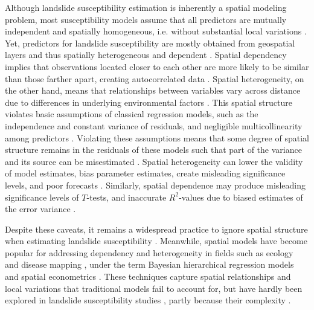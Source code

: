 \documentclass[lineno,pdflatex,sn-basic]{sn-jnl}%
\theoremstyle{thmstyleone}%
\theoremstyle{thmstyletwo}%
\theoremstyle{thmstylethree}%
\begin{document}
Although landslide susceptibility estimation is inherently a spatial modeling problem, most susceptibility models assume that all predictors are mutually independent and spatially homogeneous, i.e. without substantial local variations \citep{xiao2021reducing}. 
Yet, predictors for landslide susceptibility are mostly obtained from geospatial layers and thus spatially heterogeneous and dependent \citep{fang2024improved, liu2024regional, quevedo2022consideration, lombardo2020space}.
Spatial dependency implies that observations located closer to each other are more likely to be similar than those farther apart, creating autocorrelated data \citep{fang2024improved, anselin1988spatial}. 
Spatial heterogeneity, on the other hand, means that relationships between variables vary across distance due to differences in underlying environmental factors \citep{zhang2023mapping, fang2024improved, liu2024regional}.
This spatial structure violates basic assumptions of classical regression models, such as the independence and constant variance of residuals, and negligible multicollinearity among predictors \citep{cressie2015statistics, ripley1988statistical, anselin1988spatial}. 
Violating these assumptions means that some degree of spatial structure remains in the residuals of these models such that part of the variance and its source can be misestimated \citep{opitz2022high,rey2023geographic}. 
Spatial heterogeneity can lower the validity of model estimates, bias parameter estimates, create misleading significance levels, and poor forecasts \citep{li2022consequences}. 
Similarly, spatial dependence may produce misleading significance levels of $T$-tests, and inaccurate $R^2$-values due to biased estimates of the error variance \citep{anselin1990spatial}.

Despite these caveats, it remains a widespread practice to ignore spatial structure when estimating landslide susceptibility \citep{ fotheringham2000quantitative, schabenberger2001contemporary}. 
Meanwhile, spatial models have become popular for addressing dependency and heterogeneity in fields such as ecology and disease mapping \citep{math9111276}, under the term Bayesian hierarchical regression models \citep{haining2020regression} and spatial econometrics \citep{anselin1988spatial, arbia2016spatial}. 
These techniques capture spatial relationships and local variations that traditional models fail to account for, but have hardly been explored in landslide susceptibility studies \citep{di2023estimation,fang2024improved, liu2024regional}, partly because their complexity \citep{bryce2024updated}. 
\end{document}
